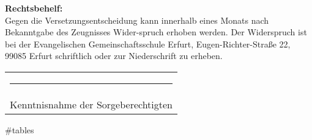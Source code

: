 {\begin{minipage}[t][.98\textheight][t]{.97\textwidth}
			\vfill
			{\footnotesize \textbf{Rechtsbehelf:}\\
				Gegen die Versetzungsentscheidung kann innerhalb eines Monats nach Bekanntgabe des Zeugnisses Wider-spruch erhoben werden. Der Widerspruch ist bei der Evangelischen Gemeinschaftsschule Erfurt, Eugen-Richter-Straße 22, 99085 Erfurt schriftlich oder zur Niederschrift zu erheben.\\\vspace{1em}
				\begin{tabularx}{\linewidth}{C{.6\linewidth}}
					\vspace{2em}\rule{\linewidth}{1pt} \\
					\centering Kenntnisnahme der Sorgeberechtigten \\
				\end{tabularx}
			}
		\end{minipage}
		
	}%
	\newpage
	\newpagedefs

	#tables

	\thispagestyle{mypagestyle}
